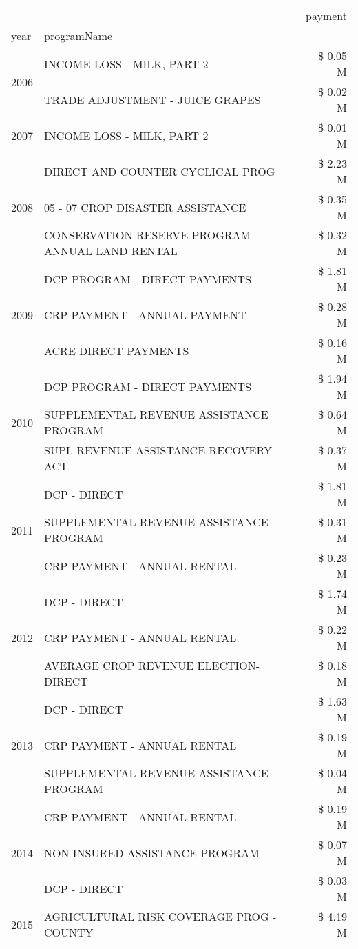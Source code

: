 \begin{tabular}{llr}
\toprule
 &  & payment \\
year & programName &  \\
\midrule
\multirow[t]{2}{*}{2006} & INCOME LOSS - MILK, PART 2 & \$ 0.05 M \\
 & TRADE ADJUSTMENT - JUICE GRAPES & \$ 0.02 M \\
\cline{1-3}
2007 & INCOME LOSS - MILK, PART 2 & \$ 0.01 M \\
\cline{1-3}
\multirow[t]{3}{*}{2008} & DIRECT AND COUNTER CYCLICAL PROG & \$ 2.23 M \\
 & 05 - 07 CROP DISASTER ASSISTANCE & \$ 0.35 M \\
 & CONSERVATION RESERVE PROGRAM - ANNUAL LAND RENTAL & \$ 0.32 M \\
\cline{1-3}
\multirow[t]{3}{*}{2009} & DCP PROGRAM - DIRECT PAYMENTS & \$ 1.81 M \\
 & CRP PAYMENT - ANNUAL PAYMENT & \$ 0.28 M \\
 & ACRE DIRECT PAYMENTS & \$ 0.16 M \\
\cline{1-3}
\multirow[t]{3}{*}{2010} & DCP PROGRAM - DIRECT PAYMENTS & \$ 1.94 M \\
 & SUPPLEMENTAL REVENUE ASSISTANCE PROGRAM & \$ 0.64 M \\
 & SUPL REVENUE ASSISTANCE RECOVERY ACT & \$ 0.37 M \\
\cline{1-3}
\multirow[t]{3}{*}{2011} & DCP - DIRECT & \$ 1.81 M \\
 & SUPPLEMENTAL REVENUE ASSISTANCE PROGRAM & \$ 0.31 M \\
 & CRP PAYMENT - ANNUAL RENTAL & \$ 0.23 M \\
\cline{1-3}
\multirow[t]{3}{*}{2012} & DCP - DIRECT & \$ 1.74 M \\
 & CRP PAYMENT - ANNUAL RENTAL & \$ 0.22 M \\
 & AVERAGE CROP REVENUE ELECTION-DIRECT & \$ 0.18 M \\
\cline{1-3}
\multirow[t]{3}{*}{2013} & DCP - DIRECT & \$ 1.63 M \\
 & CRP PAYMENT - ANNUAL RENTAL & \$ 0.19 M \\
 & SUPPLEMENTAL REVENUE ASSISTANCE PROGRAM & \$ 0.04 M \\
\cline{1-3}
\multirow[t]{3}{*}{2014} & CRP PAYMENT - ANNUAL RENTAL & \$ 0.19 M \\
 & NON-INSURED ASSISTANCE PROGRAM & \$ 0.07 M \\
 & DCP - DIRECT & \$ 0.03 M \\
\cline{1-3}
\multirow[t]{3}{*}{2015} & AGRICULTURAL RISK COVERAGE PROG - COUNTY & \$ 4.19 M \\

\end{tabular}
